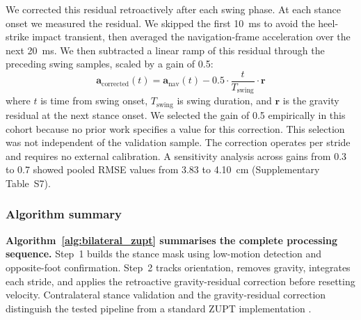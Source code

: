 \documentclass[fleqn,10pt,lineno]{wlpeerj}
\begin{document}
We corrected this residual retroactively after each swing phase. At each stance onset we measured the residual. We skipped the first 10~ms to avoid the heel-strike impact transient, then averaged the navigation-frame acceleration over the next 20~ms. We then subtracted a linear ramp of this residual through the preceding swing samples, scaled by a gain of 0.5:
\begin{equation}
\mathbf{a}_{\text{corrected}}(t) = \mathbf{a}_{\text{nav}}(t) - 0.5 \cdot \frac{t}{T_{\text{swing}}} \cdot \mathbf{r}
\end{equation}
where $t$ is time from swing onset, $T_{\text{swing}}$ is swing duration, and $\mathbf{r}$ is the gravity residual at the next stance onset. We selected the gain of 0.5 empirically in this cohort because no prior work specifies a value for this correction. This selection was not independent of the validation sample. The correction operates per stride and requires no external calibration. A sensitivity analysis across gains from 0.3 to 0.7 showed pooled RMSE values from 3.83 to 4.10~cm (Supplementary Table~S7).

\subsubsection{Algorithm summary}

\textbf{Algorithm~\ref{alg:bilateral_zupt} summarises the complete processing sequence.} Step~1 builds the stance mask using low-motion detection and opposite-foot confirmation. Step~2 tracks orientation, removes gravity, integrates each stride, and applies the retroactive gravity-residual correction before resetting velocity. Contralateral stance validation and the gravity-residual correction distinguish the tested pipeline from a standard ZUPT implementation \citep{Foxlin2005, Skog2010}.
\end{document}
